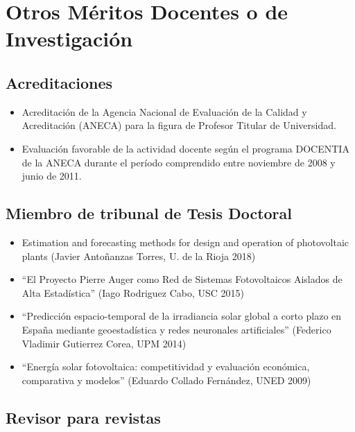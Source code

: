 \documentclass[article, a4paper]{memoir}
\begin{document}
\section{Otros Méritos Docentes o de Investigación}
\label{sec:org58198b1}
\subsection{Acreditaciones}
\label{sec:orgdfc4747}

\begin{itemize}
\item Acreditación de la Agencia Nacional de Evaluación de la Calidad y Acreditación (ANECA) para la figura de Profesor Titular de Universidad.
\end{itemize}

\begin{itemize}
\item Evaluación favorable de la actividad docente según el programa DOCENTIA de la ANECA durante el período comprendido entre noviembre de 2008 y junio de 2011.
\end{itemize}

\subsection{Miembro de tribunal de Tesis Doctoral}
\label{sec:orgcb66da5}

\begin{itemize}
\item \guillemotleft{}Estimation and forecasting methods for design and operation of photovoltaic plants\guillemotright{} (Javier Antoñanzas Torres, U. de la Rioja 2018)

\item ``El Proyecto Pierre Auger como Red de Sistemas Fotovoltaicos Aislados de Alta Estadística'' (Iago Rodriguez Cabo, USC 2015)

\item ``Predicción espacio-temporal de la irradiancia solar global a corto plazo en España mediante geoestadística y redes neuronales artificiales'' (Federico Vladimir Gutierrez Corea, UPM 2014)

\item ``Energía solar fotovoltaica: competitividad y evaluación económica, comparativa y modelos'' (Eduardo Collado Fernández, UNED 2009)
\end{itemize}

\subsection{Revisor para revistas}
\label{sec:org1f49cde}
\end{document}
